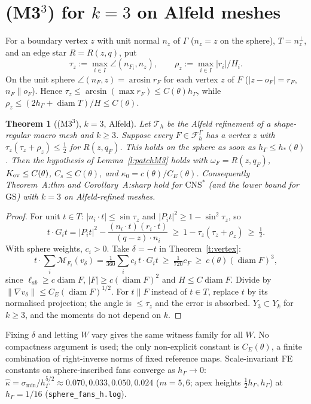 \documentclass[11pt]{article}
\newtheorem{theorem}{Theorem}[section]
\theoremstyle{definition}
\newcommand{\hG}{h_\Gamma}
\newcommand{\FG}{\mathcal F_h^\Gamma}
\newcommand{\M}{\mathcal M}
\newcommand{\CNS}{\mathrm{CNS}^\ast}
\newcommand{\GS}{\mathrm{GS}}
\newcommand{\Th}{\mathcal T_h}
\newcommand{\norm}[1]{\lVert #1\rVert}
\DeclareMathOperator{\diam}{diam}
\begin{document}
\section{(M3$^3$) for $k=3$ on Alfeld meshes}\label{s:M3}
For a boundary vertex $z$ with unit normal $n_z$ of $\Gamma$ ($n_z=z$ on the sphere), $T=n_z^\perp$, and an edge star $R=R(z,q)$, put
\[
\tau_z:=\max_{i\in I}\angle(n_{F_i},n_z),\qquad \rho_z:=\max_{i\in I}|r_i|/H_i .
\]
On the unit sphere $\angle(n_F,z)=\arcsin r_F$ for each vertex $z$ of $F$ ($|z-o_F|=r_F$, $n_F\parallel o_F$). Hence $\tau_z\le\arcsin(\max r_F)\le C(\theta)\hG$, while $\rho_z\le(2\hG+\diam T)/H\le C(\theta)$.

\begin{theorem}[(M3$^3$), $k=3$, Alfeld]\label{t:M3}
Let $\Th$ be the Alfeld refinement of a shape-regular macro mesh and $k\ge3$. Suppose every $F\in\FG$ has a vertex $z$ with $\tau_z(\tau_z+\rho_z)\le\frac12$ for $R(z,q_F)$. This holds on the sphere as soon as $\hG\le h_\ast(\theta)$. Then the hypothesis of Lemma~\ref{l:patchM3} holds with $\omega_F=R(z,q_F)$, $K_{\rm ov}\le C(\theta)$, $C_s\le C(\theta)$, and $\kappa_0=c(\theta)/C_E(\theta)$. Consequently Theorem~A:thm and Corollary~A:sharp hold for $\CNS$ (and the lower bound for $\GS$) with $k=3$ on Alfeld-refined meshes.
\end{theorem}
\begin{proof}
For unit $t\in T$: $|n_i\cdot t|\le\sin\tau_z$ and $|P_it|^2\ge1-\sin^2\tau_z$, so
\[
t\cdot G_it=|P_it|^2-\frac{(n_i\cdot t)(r_i\cdot t)}{(q-z)\cdot n_i}\ \ge\ 1-\tau_z(\tau_z+\rho_z)\ \ge\ \tfrac12 .
\]
With sphere weights, $c_i>0$. Take $\delta=-t$ in Theorem~\ref{t:vertex}:
\[
t\cdot\sum_{i}\M_{F_i}(v_\delta)=\tfrac1{360}\sum_ic_i\,t\cdot G_it\ \ge\ \tfrac1{720}c_{F}\ \ge\ c(\theta)(\diam F)^3,
\]
since $\ell_{ab}\ge c\diam F$, $|F|\ge c(\diam F)^2$ and $H\le C\diam F$. Divide by $\norm{\nabla v_\delta}\le C_E(\diam F)^{1/2}$. For $t\parallel F$ instead of $t\in T$, replace $t$ by its normalised projection; the angle is $\le\tau_z$ and the error is absorbed. $Y_3\subset Y_k$ for $k\ge3$, and the moments do not depend on $k$.
\end{proof}
\noindent Fixing $\delta$ and letting $W$ vary gives the same witness family for all $W$. No compactness argument is used; the only non-explicit constant is $C_E(\theta)$, a finite combination of right-inverse norms of fixed reference maps. Scale-invariant FE constants on sphere-inscribed fans converge as $\hG\to0$: $\hat\kappa=\sigma_{\min}/\hG^{5/2}\approx0.070,0.033,0.050,0.024$ ($m=5,6$; apex heights $\frac12\hG,\hG$) at $\hG=1/16$ (\texttt{sphere\_fans\_h.log}).
\end{document}
